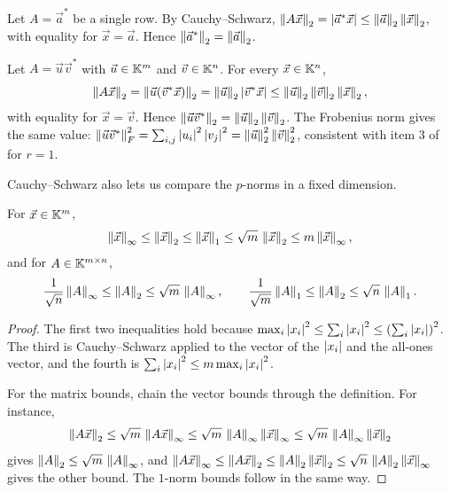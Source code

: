 \begin{example}
  Let $A = \vec{a}^\ast$ be a single row. By Cauchy--Schwarz, $\left\lVert A\vec{x} \right\rVert_2 = \left\lvert \vec{a}^\ast\vec{x} \right\rvert \le \left\lVert \vec{a} \right\rVert_2\left\lVert \vec{x} \right\rVert_2$, with equality for $\vec{x} = \vec{a}$. Hence $\left\lVert \vec{a}^\ast \right\rVert_2 = \left\lVert \vec{a} \right\rVert_2$.
\end{example}

\begin{example}
  \label{ex:outer-norm}
  Let $A = \vec{u}\vec{v}^\ast$ with $\vec{u} \in \mathbb{K}^m$ and $\vec{v} \in \mathbb{K}^n$. For every $\vec{x} \in \mathbb{K}^n$,
  \begin{equation}
    \left\lVert A\vec{x} \right\rVert_2 = \left\lVert \vec{u}(\vec{v}^\ast\vec{x}) \right\rVert_2 = \left\lVert \vec{u} \right\rVert_2\left\lvert \vec{v}^\ast\vec{x} \right\rvert \le \left\lVert \vec{u} \right\rVert_2\left\lVert \vec{v} \right\rVert_2\left\lVert \vec{x} \right\rVert_2,
  \end{equation}
  with equality for $\vec{x} = \vec{v}$. Hence $\left\lVert \vec{u}\vec{v}^\ast \right\rVert_2 = \left\lVert \vec{u} \right\rVert_2\left\lVert \vec{v} \right\rVert_2$. The Frobenius norm gives the same value: $\left\lVert \vec{u}\vec{v}^\ast \right\rVert_F^2 = \sum_{i,j}\left\lvert u_i \right\rvert^2\left\lvert v_j \right\rvert^2 = \left\lVert \vec{u} \right\rVert_2^2\left\lVert \vec{v} \right\rVert_2^2$, consistent with item 3 of  for $r = 1$.
\end{example}

Cauchy--Schwarz also lets us compare the $p$-norms in a fixed dimension.

\begin{corollary}
  \label{cor:pnorm-compare}
  For $\vec{x} \in \mathbb{K}^m$,
  \begin{equation}
    \left\lVert \vec{x} \right\rVert_\infty \le \left\lVert \vec{x} \right\rVert_2 \le \left\lVert \vec{x} \right\rVert_1 \le \sqrt{m}\,\left\lVert \vec{x} \right\rVert_2 \le m\left\lVert \vec{x} \right\rVert_\infty,
  \end{equation}
  and for $A \in \mathbb{K}^{m \times n}$,
  \begin{equation}
    \frac{1}{\sqrt{n}}\left\lVert A \right\rVert_\infty \le \left\lVert A \right\rVert_2 \le \sqrt{m}\,\left\lVert A \right\rVert_\infty, \qquad \frac{1}{\sqrt{m}}\left\lVert A \right\rVert_1 \le \left\lVert A \right\rVert_2 \le \sqrt{n}\,\left\lVert A \right\rVert_1.
  \end{equation}
\end{corollary}

\begin{proof}
  The first two inequalities hold because $\max_i\left\lvert x_i \right\rvert^2 \le \sum_i\left\lvert x_i \right\rvert^2 \le \left(\sum_i\left\lvert x_i \right\rvert\right)^2$. The third is Cauchy--Schwarz applied to the vector of the $\left\lvert x_i \right\rvert$ and the all-ones vector, and the fourth is $\sum_i\left\lvert x_i \right\rvert^2 \le m\max_i\left\lvert x_i \right\rvert^2$.

  For the matrix bounds, chain the vector bounds through the definition. For instance,
  \begin{equation}
    \left\lVert A\vec{x} \right\rVert_2 \le \sqrt{m}\,\left\lVert A\vec{x} \right\rVert_\infty \le \sqrt{m}\,\left\lVert A \right\rVert_\infty\left\lVert \vec{x} \right\rVert_\infty \le \sqrt{m}\,\left\lVert A \right\rVert_\infty\left\lVert \vec{x} \right\rVert_2
  \end{equation}
  gives $\left\lVert A \right\rVert_2 \le \sqrt{m}\,\left\lVert A \right\rVert_\infty$, and $\left\lVert A\vec{x} \right\rVert_\infty \le \left\lVert A\vec{x} \right\rVert_2 \le \left\lVert A \right\rVert_2\left\lVert \vec{x} \right\rVert_2 \le \sqrt{n}\,\left\lVert A \right\rVert_2\left\lVert \vec{x} \right\rVert_\infty$ gives the other bound. The $1$-norm bounds follow in the same way.
\end{proof}

